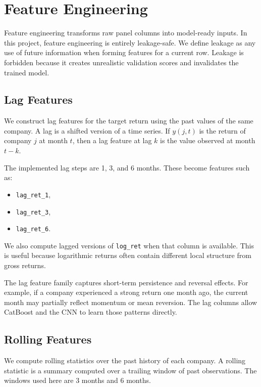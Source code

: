 \documentclass[11pt]{article}
\begin{document}
\section{Feature Engineering}

Feature engineering transforms raw panel columns into model-ready inputs. In this project, feature engineering is entirely leakage-safe. We define leakage as any use of future information when forming features for a current row. Leakage is forbidden because it creates unrealistic validation scores and invalidates the trained model.

\subsection{Lag Features}

We construct lag features for the target return using the past values of the same company. A lag is a shifted version of a time series. If $y(j,t)$ is the return of company $j$ at month $t$, then a lag feature at lag $k$ is the value observed at month $t-k$.

The implemented lag steps are 1, 3, and 6 months. These become features such as:
\begin{itemize}
    \item \texttt{lag\_ret\_1},
    \item \texttt{lag\_ret\_3},
    \item \texttt{lag\_ret\_6}.
\end{itemize}

We also compute lagged versions of \texttt{log\_ret} when that column is available. This is useful because logarithmic returns often contain different local structure from gross returns.

The lag feature family captures short-term persistence and reversal effects. For example, if a company experienced a strong return one month ago, the current month may partially reflect momentum or mean reversion. The lag columns allow CatBoost and the CNN to learn those patterns directly.

\subsection{Rolling Features}

We compute rolling statistics over the past history of each company. A rolling statistic is a summary computed over a trailing window of past observations. The windows used here are 3 months and 6 months.
\end{document}
